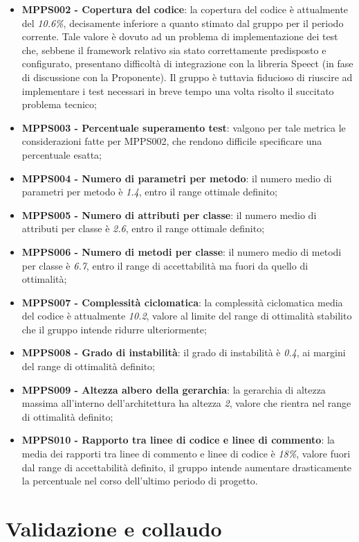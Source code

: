 \documentclass[openany,12pt,a4paper]{report}
\begin{document}
\begin{itemize}
	\item \textbf{MPPS002 - Copertura del codice}: la copertura del codice è attualmente del \textit{10.6\%}, decisamente inferiore a quanto stimato dal gruppo per il periodo corrente. Tale valore è dovuto ad un problema di implementazione dei test che, sebbene il framework relativo sia stato correttamente predisposto e configurato, presentano difficoltà di integrazione con la libreria Speect (in fase di discussione con la Proponente). Il gruppo è tuttavia fiducioso di riuscire ad implementare i test necessari in breve tempo una volta risolto il succitato problema tecnico;
	\item \textbf{MPPS003 - Percentuale superamento test}: valgono per tale metrica le considerazioni fatte per MPPS002, che rendono difficile specificare una percentuale esatta;
	\item \textbf{MPPS004 - Numero di parametri per metodo}: il numero medio di parametri per metodo è \textit{1.4}, entro il range ottimale definito;
	\item \textbf{MPPS005 - Numero di attributi per classe}: il numero medio di attributi per classe è \textit{2.6}, entro il range ottimale definito;
	\item \textbf{MPPS006 - Numero di metodi per classe}: il numero medio di metodi per classe è \textit{6.7}, entro il range di accettabilità ma fuori da quello di ottimalità;
	\item \textbf{MPPS007 - Complessità ciclomatica}: la complessità ciclomatica media del codice è attualmente \textit{10.2}, valore al limite del range di ottimalità stabilito che il gruppo intende ridurre ulteriormente;
	\item \textbf{MPPS008 - Grado di instabilità}: il grado di instabilità è \textit{0.4}, ai margini del range di ottimalità definito;
	\item \textbf{MPPS009 - Altezza albero della gerarchia}: la gerarchia di altezza massima all'interno dell'architettura ha altezza \textit{2}, valore che rientra nel range di ottimalità definito;
	\item \textbf{MPPS010 - Rapporto tra linee di codice e linee di commento}: la media dei rapporti tra linee di commento e linee di codice è \textit{18\%}, valore fuori dal range di accettabilità definito, il gruppo intende aumentare drasticamente la percentuale nel corso dell'ultimo periodo di progetto.
\end{itemize}


\section{Validazione e collaudo}
\end{document}
